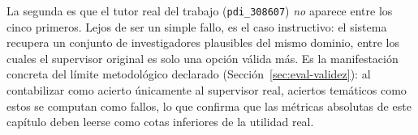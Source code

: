 La segunda es que el tutor real del trabajo (\texttt{pdi\_308607}) \emph{no} aparece entre los cinco primeros.
Lejos de ser un simple fallo, es el caso instructivo: el sistema recupera un conjunto de investigadores plausibles del mismo dominio, entre los cuales el supervisor original es solo una opción válida más.
Es la manifestación concreta del límite metodológico declarado (Sección~\ref{sec:eval-validez}): al contabilizar como acierto únicamente al supervisor real, aciertos temáticos como estos se computan como fallos, lo que confirma que las métricas absolutas de este capítulo deben leerse como cotas inferiores de la utilidad real.
